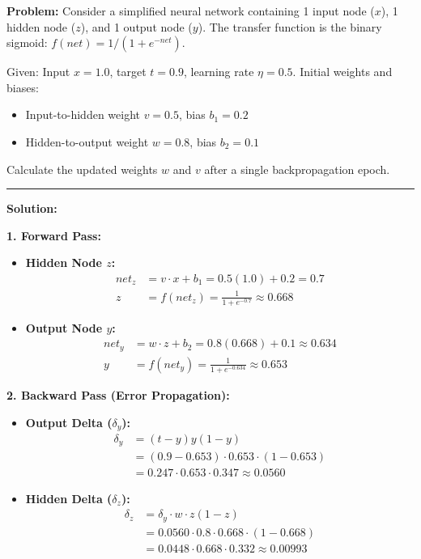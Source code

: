 \documentclass[12pt,a4paper]{article}
\begin{document}
\begin{tcolorbox}[examplebox, title={Backpropagation Step-by-Step Numerical}]
\textbf{Problem:} Consider a simplified neural network containing 1 input node ($x$), 1 hidden node ($z$), and 1 output node ($y$). The transfer function is the binary sigmoid: $f(net) = 1/(1 + e^{-net})$. 
\par
Given: Input $x = 1.0$, target $t = 0.9$, learning rate $\eta = 0.5$.
Initial weights and biases:
\begin{itemize}[leftmargin=*, itemsep=2pt]
  \item Input-to-hidden weight $v = 0.5$, bias $b_1 = 0.2$
  \item Hidden-to-output weight $w = 0.8$, bias $b_2 = 0.1$
\end{itemize}
Calculate the updated weights $w$ and $v$ after a single backpropagation epoch.
\par\vspace{4pt}\noindent\rule{\linewidth}{0.5pt}\par
\textbf{Solution:}

\textbf{1. Forward Pass:}
\begin{itemize}[leftmargin=*, itemsep=2.5pt]
  \item \textbf{Hidden Node $z$:}
    \begin{align*}
      net_z &= v \cdot x + b_1 = 0.5(1.0) + 0.2 = 0.7 \\
      z &= f(net_z) = \frac{1}{1 + e^{-0.7}} \approx 0.668
    \end{align*}
  \item \textbf{Output Node $y$:}
    \begin{align*}
      net_y &= w \cdot z + b_2 = 0.8(0.668) + 0.1 \approx 0.634 \\
      y &= f(net_y) = \frac{1}{1 + e^{-0.634}} \approx 0.653
    \end{align*}
\end{itemize}

\par\vspace{4pt}
\textbf{2. Backward Pass (Error Propagation):}
\begin{itemize}[leftmargin=*, itemsep=2.5pt]
  \item \textbf{Output Delta ($\delta_y$):}
    \begin{align*}
      \delta_y &= (t - y) y (1 - y) \\
      &= (0.9 - 0.653) \cdot 0.653 \cdot (1 - 0.653) \\
      &= 0.247 \cdot 0.653 \cdot 0.347 \approx 0.0560
    \end{align*}
  \item \textbf{Hidden Delta ($\delta_z$):}
    \begin{align*}
      \delta_z &= \delta_y \cdot w \cdot z(1 - z) \\
      &= 0.0560 \cdot 0.8 \cdot 0.668 \cdot (1 - 0.668) \\
      &= 0.0448 \cdot 0.668 \cdot 0.332 \approx 0.00993
    \end{align*}
\end{itemize}


\end{tcolorbox}
\end{document}
